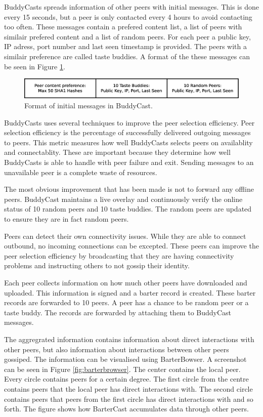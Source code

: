 BuddyCasts spreads information of other peers with initial messages.
This is done every 15 seconds, but a peer is only contacted every 4 hours to avoid contacting too often.
These messages contain a prefered content list, a list of peers with similair prefered content
and a list of random peers.
For each peer a public key, IP adress, port number and last seen timestamp is provided.
The peers with a similair preference are called taste buddies.
A format of the these messages can be seen in Figure \ref{fig:buddycast-format}.

\begin{figure}
	\centerline{\includegraphics[scale=0.3]{relatedWork/figs/buddycast-format.eps}}
	\caption{Format of initial messages in BuddyCast\cite{pouwelse-buddycast}.}
	\label{fig:buddycast-format}
\end{figure}

BuddyCasts uses several techniques to improve the peer selection efficiency.
Peer selection efficiency is the percentage of successfully delivered outgoing messages to peers.
This metric measures how well BuddyCasts selects peers on availablity and connectablity.
These are important because they determine how well BuddyCasts is able to handle with peer failure and exit.
Sending messages to an unavailable peer is a complete waste of resources.

The most obvious improvement that has been made is not to forward any offline peers.
BuddyCast maintains a live overlay
and continuously verify the online status of 10 random peers and 10 taste buddies.
The random peers are updated to ensure they are in fact random peers.

Peers can detect their own connectivity issues.
While they are able to connect outbound,
no incoming connections can be excepted.
These peers can improve the peer selection efficiency
by broadcasting that they are having connectivity problems
and instructing others to not gossip their identity.

Each peer collects information on how much other peers have downloaded and uploaded.
This information is signed and a barter record is created.
These barter records are forwarded to 10 peers.
A peer has a chance to be random peer or a taste buddy.
The records are forwarded by attaching them to BuddyCast messages.

The aggregrated information contains information about direct interactions with other peers,
but also information about interactions between other peers gossiped.
The information can be visualised using BarterBowser.
A screenshot can be seen in Figure \ref{fig:barterbrowser}.
The center contains the local peer.
Every circle contains peers for a certain degree.
The first circle from the centre contains peers that the local peer has direct interactions with.
The second circle contains peers that peers from the first circle has direct interactions with and so forth.
The figure shows how BarterCast accumulates data through other peers.

